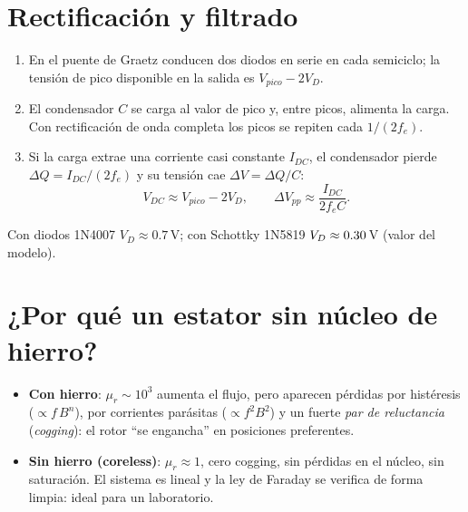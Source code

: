 \documentclass[11pt]{article}
\begin{document}
\section{Rectificación y filtrado}
\begin{enumerate}
  \item En el puente de Graetz conducen dos diodos en serie en cada semiciclo; la tensión de pico disponible en la
        salida es $V_{pico}-2V_D$.
  \item El condensador $C$ se carga al valor de pico y, entre picos, alimenta la carga. Con rectificación de onda
        completa los picos se repiten cada $1/(2f_e)$.
  \item Si la carga extrae una corriente casi constante $I_{DC}$, el condensador pierde
        $\Delta Q=I_{DC}/(2f_e)$ y su tensión cae $\Delta V=\Delta Q/C$:
        \begin{equation}
          V_{DC}\approx V_{pico}-2V_D,\qquad \Delta V_{pp}\approx\frac{I_{DC}}{2f_eC}.
        \end{equation}
\end{enumerate}
Con diodos 1N4007 $V_D\approx0.7$\,V; con Schottky 1N5819 $V_D\approx0.30$\,V (valor del modelo).

\section{¿Por qué un estator sin núcleo de hierro?}
\begin{itemize}
  \item \textbf{Con hierro}: $\mu_r\sim10^3$ aumenta el flujo, pero aparecen pérdidas por histéresis
        ($\propto f\,B^{n}$), por corrientes parásitas ($\propto f^2B^2$) y un fuerte \emph{par de reluctancia}
        (\emph{cogging}): el rotor ``se engancha'' en posiciones preferentes.
  \item \textbf{Sin hierro (coreless)}: $\mu_r\approx1$, cero cogging, sin pérdidas en el núcleo, sin saturación.
        El sistema es lineal y la ley de Faraday se verifica de forma limpia: ideal para un laboratorio.
\end{itemize}

\end{document}

